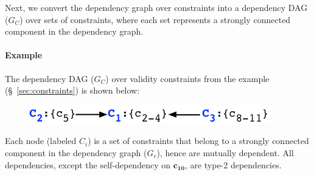 Next, we convert the dependency graph over constraints into a
dependency DAG ($G_C$) over sets of constraints, where each set
represents a strongly connected component in the dependency graph.

\paragraph{Example} The dependency DAG ($G_C$) over validity
constraints from the  example (\S~\ref{sec:constraints}) is
shown below: %
\vspace*{-0.08in}
\begin{figure}[H]
\includegraphics[scale=0.6]{DepDAG.png}
\end{figure}
\vspace*{-0.08in}
Each node (labeled $C_i$) is a set of constraints that belong to a
strongly connected component in the dependency graph ($G_c$), hence
are mutually dependent. All dependencies, except the self-dependency
on $\mathbf{c_{10}}$, are type-2 dependencies.

